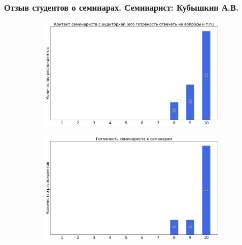         \subsubsection{Отзыв студентов о семинарах. Семинарист: Кубышкин А.В.}
            \begin{figure}[H]
                \centering
                \begin{subfigure}[b]{0.45\textwidth}
                    \centering
                    \includegraphics[width=\textwidth]{images/3 course/Общая физика - квантовая физика/seminarists-marks-Кубышкин А.В.-0.png}
                \end{subfigure}
                \begin{subfigure}[b]{0.45\textwidth}
                    \centering
                    \includegraphics[width=\textwidth]{images/3 course/Общая физика - квантовая физика/seminarists-marks-Кубышкин А.В.-1.png}
                \end{subfigure}
                \begin{subfigure}[b]{0.45\textwidth}

\end{subfigure}
\end{figure}
